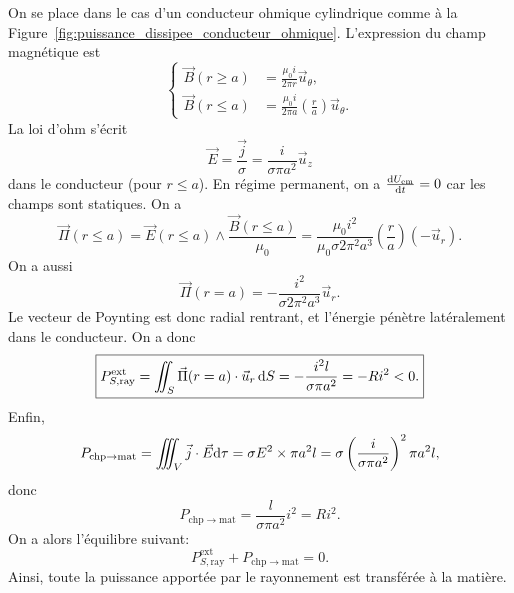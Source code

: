 On se place dans le cas d'un conducteur ohmique cylindrique comme à la Figure~\ref{fig:puissance_dissipee_conducteur_ohmique}. L'expression du champ magnétique est
\begin{equation}
    \left\lbrace
        \begin{aligned}
            \vec{B}(r\geqslant a)&=\frac{\mu_0 i}{2\pi r}\vec{u}_{\theta},\\
            \vec{B}(r\leqslant a)&=\frac{\mu_0 i}{2\pi a}\left(\frac{r}{a}\right)\vec{u}_{\theta}.
        \end{aligned}
    \right.
\end{equation}
La loi d'ohm s'écrit
\begin{equation}
    \vec{E}=\frac{\vec{j}}{\sigma}=\frac{i}{\sigma\pi a^{2}}\vec{u}_z
\end{equation}
dans le conducteur (pour $r\leqslant a$). En régime permanent, on a $\frac{\mathrm{d} U_{\mathrm{em}}}{\mathrm{d} t}=0$ car les champs sont statiques. On a 
\begin{equation}
    \vec{\Pi}(r \leqslant a)=\vec{E}(r\leqslant a)\wedge \frac{\vec{B}(r\leqslant a)}{\mu_0}=\frac{\mu_0 i^{2}}{\mu_0\sigma 2\pi^{2}a^{3}}\left(\frac{r}{a}\right)(-\vec{u}_r).
\end{equation}
On a aussi
\begin{equation}
    \boxed{
        \vec{\Pi}(r=a)=-\frac{i^{2}}{\sigma 2\pi^{2}a^{3}}\vec{u}_r.
    }
\end{equation}
Le vecteur de Poynting est donc radial rentrant, et l'énergie pénètre latéralement dans le conducteur.
On a donc
\begin{equation}
    \boxed{
        P_{S,\mathrm{ray}}^{\mathrm{ext}}=\iint_{S}\vec{\Pi}(r=a)\cdot\vec{u}_r\,\mathrm{d} S=-\frac{i^{2}l}{\sigma\pi a^{2}}=-R i^{2}<0.
    }
\end{equation}
Enfin,
\begin{equation}
    P_{\mathrm{chp}\to\mathrm{mat}}=\iiint_{V}\vec{j}\cdot\vec{E}\mathrm{d}\tau=\sigma E^{2}\times\pi a^{2}l=\sigma\left(\frac{i}{\sigma\pi a^{2}}\right)^{2}\pi a^{2}l,
\end{equation}
donc
\begin{equation}
    \boxed{
        P_{\mathrm{chp}\to\mathrm{mat}}=\frac{l}{\sigma\pi a^{2}}i^{2}=Ri^{2}.
    }
\end{equation}
On a alors l'équilibre suivant:
\begin{equation}
    \boxed{
        P_{S,\mathrm{ray}}^{\mathrm{ext}}+P_{\mathrm{chp}\to\mathrm{mat}}=0.
    }
\end{equation}
Ainsi, toute la puissance apportée par le rayonnement est transférée à la matière.